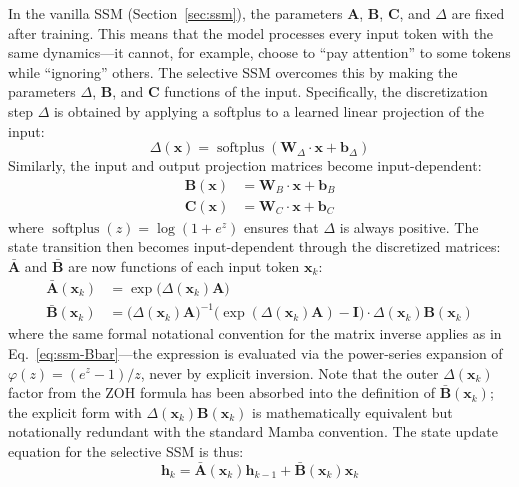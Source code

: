 \documentclass[12pt,a4paper]{article}
\newcommand{\softplus}{\operatorname{softplus}}
\renewcommand{\vec}[1]{\mathbf{#1}}
\begin{document}
In the vanilla SSM (Section~\ref{sec:ssm}), the parameters $\mathbf{A}$, $\mathbf{B}$, $\mathbf{C}$, and $\Delta$ are fixed after training. This means that the model processes every input token with the same dynamics---it cannot, for example, choose to ``pay attention'' to some tokens while ``ignoring'' others. The selective SSM overcomes this by making the parameters $\Delta$, $\mathbf{B}$, and $\mathbf{C}$ functions of the input. Specifically, the discretization step $\Delta$ is obtained by applying a softplus to a learned linear projection of the input:
\begin{equation}
\Delta(\vec{x}) = \softplus(\mathbf{W}_\Delta \cdot \vec{x} + \vec{b}_\Delta) \label{eq:mamba-delta}
\end{equation}
Similarly, the input and output projection matrices become input-dependent:
\begin{align}
\mathbf{B}(\vec{x}) &= \mathbf{W}_B \cdot \vec{x} + \vec{b}_B \label{eq:mamba-B} \\
\mathbf{C}(\vec{x}) &= \mathbf{W}_C \cdot \vec{x} + \vec{b}_C \label{eq:mamba-C}
\end{align}
where $\softplus(z) = \log(1 + e^z)$ ensures that $\Delta$ is always positive. The state transition then becomes input-dependent through the discretized matrices: $\bar{\mathbf{A}}$ and $\bar{\mathbf{B}}$ are now functions of each input token $\vec{x}_k$:
\begin{align}
\bar{\mathbf{A}}(\vec{x}_k) &= \exp\bigl(\Delta(\vec{x}_k) \mathbf{A}\bigr) \label{eq:mamba-Abar} \\
\bar{\mathbf{B}}(\vec{x}_k) &= \bigl(\Delta(\vec{x}_k) \mathbf{A}\bigr)^{-1} \bigl(\exp(\Delta(\vec{x}_k) \mathbf{A}) - \mathbf{I}\bigr) \cdot \Delta(\vec{x}_k) \mathbf{B}(\vec{x}_k) \label{eq:mamba-Bbar}
\end{align}
where the same formal notational convention for the matrix inverse applies as in Eq.~\eqref{eq:ssm-Bbar}---the expression is evaluated via the power-series expansion of $\varphi(z) = (e^z - 1)/z$, never by explicit inversion. Note that the outer $\Delta(\vec{x}_k)$ factor from the ZOH formula has been absorbed into the definition of $\bar{\mathbf{B}}(\vec{x}_k)$; the explicit form with $\Delta(\vec{x}_k) \mathbf{B}(\vec{x}_k)$ is mathematically equivalent but notationally redundant with the standard Mamba convention. The state update equation for the selective SSM is thus:
\begin{equation}
\vec{h}_k = \bar{\mathbf{A}}(\vec{x}_k) \vec{h}_{k-1} + \bar{\mathbf{B}}(\vec{x}_k) \vec{x}_k \label{eq:mamba-update}
\end{equation}
\end{document}
